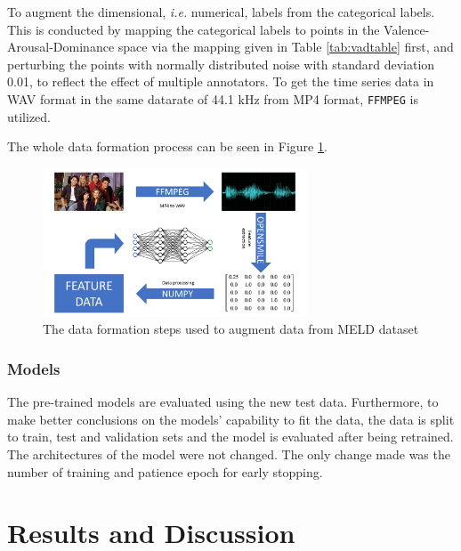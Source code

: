 \documentclass[a4paper,11pt]{article}
\begin{document}
To augment the dimensional, \textit{i.e.} numerical, labels from the categorical labels. This is conducted by mapping the categorical labels to points in the Valence-Arousal-Dominance space via the mapping given in Table \ref{tab:vadtable} first, and perturbing the points with normally distributed noise with standard deviation 0.01, to reflect the effect of multiple annotators. To get the time series data in WAV format in the same datarate of 44.1 kHz from MP4 format, \texttt{FFMPEG} is utilized.   

The whole data formation process can be seen in Figure \ref{fig:dataformation}.

\begin{figure}[h]
\centering
\includegraphics[width=0.7\textwidth]{Presentation.png}
\caption{The data formation steps used to augment data from MELD dataset}\label{fig:dataformation}
\end{figure}

\subsubsection{Models}

The pre-trained models are evaluated using the new test data. Furthermore, to make better conclusions on the models' capability to fit the data, the data is split to train, test and validation sets and the model is evaluated after being retrained. The architectures of the model were not changed. The only change made was the number of training and patience epoch for early stopping. 

\pagebreak

\section{Results and Discussion} \label{sec:results}

\pagebreak

\printbibliography
\end{document}
